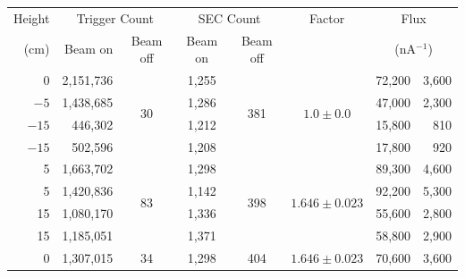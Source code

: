 \begin{table}
  \begin{center}
    \begin{tabular}{ r | r | c | c | c | c | r@{~\(\pm\)~}r } 
      Height  &  \multicolumn{2}{c|}{Trigger Count} &  \multicolumn{2}{c|}{SEC Count}  &  Factor  &  \multicolumn{2}{c}{Flux}          \\
      (cm)    &        Beam on  &  Beam off         &  Beam on &  Beam off             &          &  \multicolumn{2}{c}{(nA\(^{-1}\))} \\
      \hline
        0      &  2,151,736  &    \multirow{4}{*}{30}   &   1,255  &  \multirow{4}{*}{381} &  \multirow{4}{*}{\( 1.0\pm0.0 \)}  
                                                                                                  &  72,200  & 3,600 \\
      \(-5 \)  &  1,438,685  &                          &   1,286  &                       &          &  47,000  & 2,300 \\
      \(-15\)  &    446,302  &                          &   1,212  &                       &          &  15,800  &   810 \\
      \(-15\)  &    502,596  &                          &   1,208  &                       &          &  17,800  &   920 \\
      \hline            
        5      &  1,663,702  &   \multirow{4}{*}{83}    &   1,298  &  \multirow{4}{*}{398} &  \multirow{4}{*}{\( 1.646\pm0.023 \)}  
                                                                                                  &  89,300 & 4,600  \\
        5      &  1,420,836  &                          &   1,142  &                       &          &  92,200 & 5,300  \\
       15      &  1,080,170  &                          &   1,336  &                       &          &  55,600 & 2,800  \\
       15      &  1,185,051  &                          &   1,371  &                       &          &  58,800 & 2,900  \\    
       \hline
        0      &  1,307,015  &         34               &   1,298  &             404       & \(1.646\pm0.023\)
                                                                                                  &  70,600 & 3,600  \\

\end{tabular}
\end{center}
\end{table}
